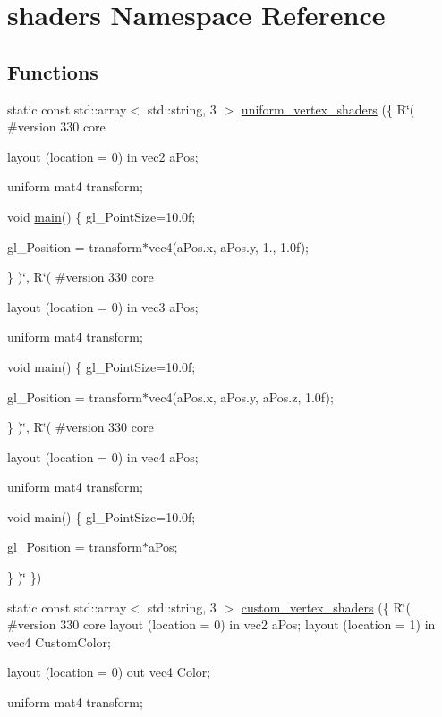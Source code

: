 \hypertarget{namespaceshaders}{}\section{shaders Namespace Reference}
\label{namespaceshaders}
\subsection*{Functions}
\begin{DoxyCompactItemize}
\item 
static const std\+::array$<$ std\+::string, 3 $>$ \mbox{\hyperlink{namespaceshaders_ab2247ec9fae03a386582be893b9ce9dd}{uniform\+\_\+vertex\+\_\+shaders}} (\{ R\char`\"{}(
\#version 330 core

layout (location = 0) in vec2 a\+Pos;

uniform mat4 transform;

void \mbox{\hyperlink{gtest__tests_8cpp_a3c04138a5bfe5d72780bb7e82a18e627}{main}}()
\{
gl\+\_\+\+Point\+Size=10.\+0f;

gl\+\_\+\+Position = transform$\ast$vec4(a\+Pos.\+x, a\+Pos.\+y, 1., 1.\+0f);

\}
)\char`\"{}, R\char`\"{}(
\#version 330 core

layout (location = 0) in vec3 a\+Pos;

uniform mat4 transform;

void main()
\{
gl\+\_\+\+Point\+Size=10.\+0f;

gl\+\_\+\+Position = transform$\ast$vec4(a\+Pos.\+x, a\+Pos.\+y, a\+Pos.\+z, 1.\+0f);

\}
)\char`\"{}, R\char`\"{}(
\#version 330 core

layout (location = 0) in vec4 a\+Pos;

uniform mat4 transform;

void main()
\{
gl\+\_\+\+Point\+Size=10.\+0f;

gl\+\_\+\+Position = transform$\ast$a\+Pos;

\}
)\char`\"{} \})
\item 
static const std\+::array$<$ std\+::string, 3 $>$ \mbox{\hyperlink{namespaceshaders_ad65f4b831f91212b1f8f7da07ada6898}{custom\+\_\+vertex\+\_\+shaders}} (\{ R\char`\"{}(
\#version 330 core
layout (location = 0) in vec2 a\+Pos;
layout (location = 1) in vec4 Custom\+Color;

layout (location = 0) out vec4 Color;

uniform mat4 transform;


\end{DoxyCompactItemize}
